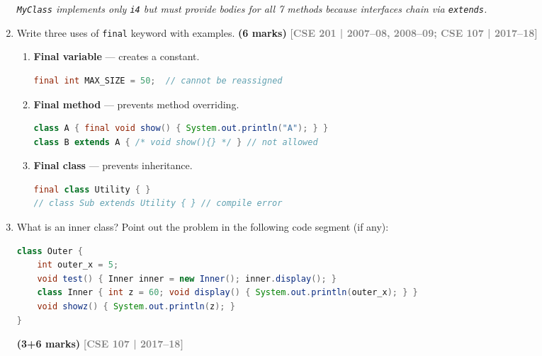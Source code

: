 \documentclass[12pt,a3paper]{article}
\newcommand{\yr}[1]{\hfill\textcolor{gray}{\small\textbf{[#1]}}}
\newcommand{\mk}[1]{\textcolor{orange!70!black}{\small\textbf{(#1 marks)}}}
\begin{document}
\begin{enumerate}
\begin{tcolorbox}
\textit{\texttt{MyClass} implements only \texttt{i4} but must provide
bodies for all 7 methods because interfaces chain via \texttt{extends}.}

\end{tcolorbox}



\item Write three uses of \texttt{final} keyword with examples. \mk{6}
\yr{CSE 201 | 2007--08, 2008--09; CSE 107 | 2017--18}

\begin{tcolorbox}[enhanced,breakable,ansbox,
  colback=cD!4,colframe=cD,boxrule=0.8pt,arc=5pt,
  title={\textbf{Answer --- Three Uses of \texttt{final} with Examples}},
  fonttitle=\bfseries\color{white},colbacktitle=cD]

\begin{enumerate}[label=\textbf{\arabic*.}]
  \item \textbf{Final variable} --- creates a constant.
\begin{lstlisting}[language=Java]
final int MAX_SIZE = 50;  // cannot be reassigned
\end{lstlisting}

  \item \textbf{Final method} --- prevents method overriding.
\begin{lstlisting}[language=Java]
class A { final void show() { System.out.println("A"); } }
class B extends A { /* void show(){} */ } // not allowed
\end{lstlisting}

  \item \textbf{Final class} --- prevents inheritance.
\begin{lstlisting}[language=Java]
final class Utility { }
// class Sub extends Utility { } // compile error
\end{lstlisting}
\end{enumerate}

\end{tcolorbox}

\item What is an inner class? Point out the problem in the following code segment (if any):
\begin{lstlisting}[language=Java]
class Outer {
    int outer_x = 5;
    void test() { Inner inner = new Inner(); inner.display(); }
    class Inner { int z = 60; void display() { System.out.println(outer_x); } }
    void showz() { System.out.println(z); }
}
\end{lstlisting}
\mk{3+6}
\yr{CSE 107 | 2017--18}


\end{enumerate}
\end{document}
